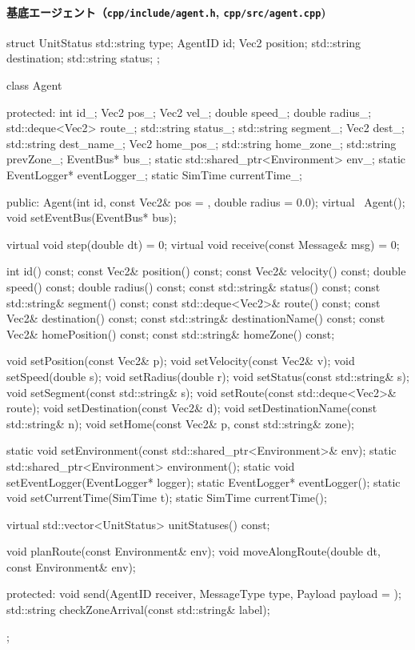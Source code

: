 \documentclass[10pt,letterpaper]{jsarticle}
\begin{document}
\paragraph{基底エージェント（\texttt{cpp/include/agent.h}, \texttt{cpp/src/agent.cpp})}
\begin{cppcode}
struct UnitStatus {
    std::string type;
    AgentID id;
    Vec2 position;
    std::string destination;
    std::string status;
};

class Agent {
protected:
    int id_;
    Vec2 pos_;
    Vec2 vel_;
    double speed_;
    double radius_;
    std::deque<Vec2> route_;
    std::string status_;
    std::string segment_;
    Vec2 dest_;
    std::string dest_name_;
    Vec2 home_pos_;
    std::string home_zone_;
    std::string prevZone_;
    EventBus* bus_;
    static std::shared_ptr<Environment> env_;
    static EventLogger* eventLogger_;
    static SimTime currentTime_;

public:
    Agent(int id, const Vec2& pos = {}, double radius = 0.0);
    virtual ~Agent();
    void setEventBus(EventBus* bus);

    virtual void step(double dt) = 0;
    virtual void receive(const Message& msg) = 0;

    int id() const;
    const Vec2& position() const;
    const Vec2& velocity() const;
    double speed() const;
    double radius() const;
    const std::string& status() const;
    const std::string& segment() const;
    const std::deque<Vec2>& route() const;
    const Vec2& destination() const;
    const std::string& destinationName() const;
    const Vec2& homePosition() const;
    const std::string& homeZone() const;

    void setPosition(const Vec2& p);
    void setVelocity(const Vec2& v);
    void setSpeed(double s);
    void setRadius(double r);
    void setStatus(const std::string& s);
    void setSegment(const std::string& s);
    void setRoute(const std::deque<Vec2>& route);
    void setDestination(const Vec2& d);
    void setDestinationName(const std::string& n);
    void setHome(const Vec2& p, const std::string& zone);

    static void setEnvironment(const std::shared_ptr<Environment>& env);
    static std::shared_ptr<Environment> environment();
    static void setEventLogger(EventLogger* logger);
    static EventLogger* eventLogger();
    static void setCurrentTime(SimTime t);
    static SimTime currentTime();

    virtual std::vector<UnitStatus> unitStatuses() const;

    void planRoute(const Environment& env);
    void moveAlongRoute(double dt, const Environment& env);

protected:
    void send(AgentID receiver, MessageType type, Payload payload = {});
    std::string checkZoneArrival(const std::string& label);
};
\end{cppcode}
\end{document}

